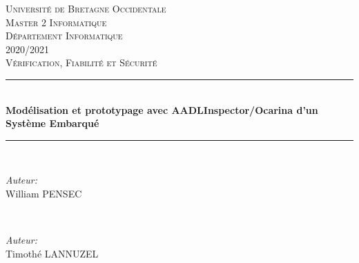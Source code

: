 \documentclass[a4paper,12pt]{report}
\begin{document}
   \begin{titlepage}
    
    \newcommand{\HRule}{\rule{\linewidth}{0.5mm}} %
    
    \center %
     
    
    \textsc{\LARGE Université de Bretagne Occidentale}\\[1.5cm] %
		\textsc{\Large Master 2 Informatique}\\[0.5cm] %
		\textsc{\Large Département Informatique}\\[1.5cm] %
		{\large 2020/2021}\\[1.5cm] %
		
    \textsc{\large Vérification, Fiabilité et Sécurité}\\[1cm] %
    
    
   \HRule \\[0.4cm]
    { \huge \bfseries Modélisation et prototypage avec AADLInspector/Ocarina d'un Système Embarqué}\\[0.2cm] %
    \HRule \\[1cm]
     
    
    \begin{minipage}{0.48\textwidth}
			\begin{flushleft} \large
				\emph{Auteur:}\\
					William \textsc{PENSEC} %
			\end{flushleft}
    \end{minipage}
		~
		\begin{minipage}{0.48\textwidth}
			\begin{flushright} \large
				\emph{Auteur:}\\
					Timothé \textsc{LANNUZEL} %
			\end{flushright}
    \end{minipage}\\[1.5cm]
    

\end{titlepage}
\end{document}
